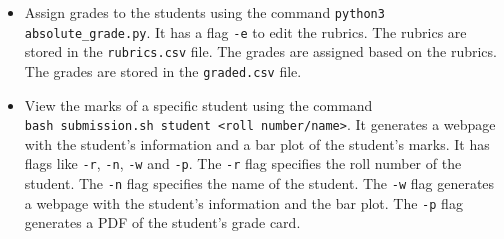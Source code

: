 \documentclass{article}
\begin{document}
\begin{itemize}
    \item Assign grades to the students using the command \verb|python3 absolute_grade.py|. It has a flag \texttt{-e} to edit the rubrics. The rubrics are stored in the \texttt{rubrics.csv} file. The grades are assigned based on the rubrics. The grades are stored in the \texttt{graded.csv} file.
    \item View the marks of a specific student using the command \\ \verb|bash submission.sh student <roll number/name>|. It generates a webpage with the student's information and a bar plot of the student's marks. It has flags like \texttt{-r}, \texttt{-n}, \texttt{-w} and \texttt{-p}. The \texttt{-r} flag specifies the roll number of the student. The \texttt{-n} flag specifies the name of the student. The \texttt{-w} flag generates a webpage with the student's information and the bar plot. The \texttt{-p} flag generates a PDF of the student's grade card.
    
\end{itemize}

\printbibliography{}
\end{document}
